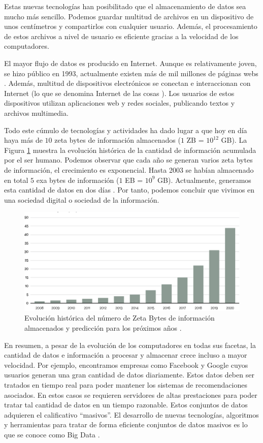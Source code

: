 \documentclass[10pt]{article}
\begin{document}
	Estas nuevas tecnologías han posibilitado que el almacenamiento de datos sea mucho más sencillo. Podemos guardar multitud de archivos en un dispositivo de unos centímetros y compartirlos con cualquier usuario. Además, el procesamiento de estos archivos a nivel de usuario es eficiente gracias a la velocidad de los computadores. 
	
	El mayor flujo de datos es producido en Internet. Aunque es relativamente joven, se hizo público en 1993, actualmente existen más de mil millones de páginas webs \cite{internet}. Además, multitud de dispositivos electrónicos se conectan e interaccionan con Internet (lo que se denomina Internet de las cosas \cite{big-data-internet-cosas}). Los usuarios de estos dispositivos utilizan aplicaciones web y redes sociales, publicando textos y archivos multimedia. 
	
	Todo este cúmulo de tecnologías y actividades ha dado lugar a que hoy en día haya más de $10$ zeta bytes de información almacenados ($1$ ZB = $10^{12}$ GB). La Figura \ref{fig:zeta-bytes} muestra la evolución histórica de la cantidad de información acumulada por el ser humano. Podemos observar que cada año se generan varios zeta bytes de información, el crecimiento es exponencial. Hasta 2003 se habían almacenado en total $5$ exa bytes de información ($1$ EB = $10^9$ GB). Actualmente, generamos esta cantidad de datos en dos días \cite{big-data}. Por tanto, podemos concluir que vivimos en una sociedad digital o sociedad de la información.

	\begin{figure}[H]
       	\centering
       	\includegraphics[width=14cm]{./images/Data.png}
       	\caption{Evolución histórica del número de Zeta Bytes de información almacenados y predicción para los próximos años \cite{zeta-bytes}.} 
       	\label{fig:zeta-bytes}
	 \end{figure}

	En resumen, a pesar de la evolución de los computadores en todas sus facetas, la cantidad de datos e información a procesar y almacenar crece incluso a mayor velocidad. Por ejemplo, encontramos empresas como Facebook y Google cuyos usuarios generan una gran cantidad de datos diariamente. Estos datos deben ser tratados en tiempo real para poder mantener los sistemas de recomendaciones asociados. En estos casos se requieren servidores de altas prestaciones para poder tratar tal cantidad de datos en un tiempo razonable. Estos conjuntos de datos adquieren el calificativo ``masivos''. El desarrollo de nuevas tecnologías, algoritmos y herramientas para tratar de forma eficiente conjuntos de datos masivos es lo que se conoce como Big Data \cite{big-data-herrera}.
	
\end{document}
